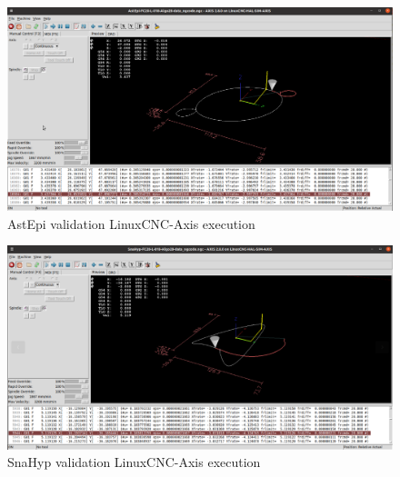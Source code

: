 \clearpage
\pagebreak
\begin{landscape}
	
	\begin{figure}
		\centering
		\caption  {AstEpi validation LinuxCNC-Axis execution}
		\label{img-AstEpi validation LinuxCNC-Axis execution} \includegraphics[width=1.65\textwidth]{Chap4/Validation/AstEpi/AstEpi-FC20-L-018-Algo28-CNC-Validation-Screenshot_2023-10-09_11-01-23.png} 
	\end{figure}
	
\end{landscape}

\clearpage
\pagebreak
\begin{landscape}
	
	\begin{figure}
		\centering
		\caption  {SnaHyp validation LinuxCNC-Axis execution}
		\label{img-SnaHyp validation LinuxCNC-Axis execution} \includegraphics[width=1.65\textwidth]{Chap4/Validation/SnaHyp/SnaHyp-FC20-L-018-Algo28-CNC-Validation-Screenshot_2023-10-09_11-30-38.png} 
	\end{figure}
	
\end{landscape}

\clearpage
\pagebreak